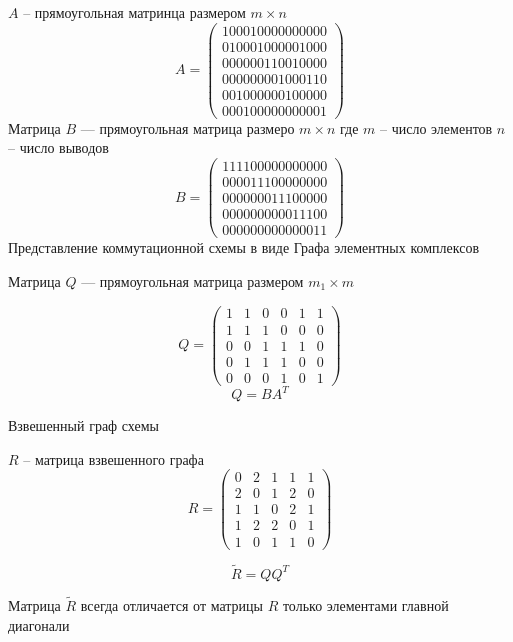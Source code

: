 \documentclass{article}
\begin{document}
	$A$ -- прямоугольная матринца размером $m \times n$
	$$
	A =
	\begin{pmatrix}
		1 0 0 0 1 0 0 0 0 0 0 0 0 0 0\\
		0 1 0 0 0 1 0 0 0 0 0 1 0 0 0\\
		0 0 0 0 0 0 1 1 0 0 1 0 0 0 0\\
		0 0 0 0 0 0 0 0 1 0 0 0 1 1 0\\
		0 0 1 0 0 0 0 0 0 1 0 0 0 0 0\\
		0 0 0 1 0 0 0 0 0 0 0 0 0 0 1
	\end{pmatrix}
	$$
	Матрица $B$ --- прямоугольная матрица размеро $m \times n$ где $m$ -- число элементов $n$ -- число выводов
	$$
	B =
	\begin{pmatrix}
		1 1 1 1 0 0 0 0 0 0 0 0 0 0 0\\
		0 0 0 0 1 1 1 0 0 0 0 0 0 0 0\\
		0 0 0 0 0 0 0 1 1 1 0 0 0 0 0\\
		0 0 0 0 0 0 0 0 0 0 1 1 1 0 0\\
		0 0 0 0 0 0 0 0 0 0 0 0 0 1 1
	\end{pmatrix}
	$$
	Представление коммутационной схемы в виде Графа элементных комплексов

	Матрица $Q$ --- прямоугольная матрица размером $m_1 \times m$

	$$
	Q =
	\begin{pmatrix}
		1 & 1 & 0 & 0 & 1 & 1\\
		1 & 1 & 1 & 0 & 0 & 0\\
		0 & 0 & 1 & 1 & 1 & 0\\
		0 & 1 & 1 & 1 & 0 & 0\\
		0 & 0 & 0 & 1 & 0 & 1
	\end{pmatrix}
	$$
	$$
	Q = B A^T
	$$

	Взвешенный граф схемы

	
	$R$ -- матрица взвешенного графа
	$$
	R = \begin{pmatrix}
		0 & 2 & 1 & 1 & 1\\
		2 & 0 & 1 & 2 & 0\\
		1 & 1 & 0 & 2 & 1\\
		1 & 2 & 2 & 0 & 1\\
		1 & 0 & 1 & 1 & 0
	\end{pmatrix}
	$$

	$$
	\widetilde{R} = Q Q^T
	$$
	
	Матрица $\widetilde{R}$ всегда отличается от матрицы $R$ только элементами главной диагонали
\end{document}
